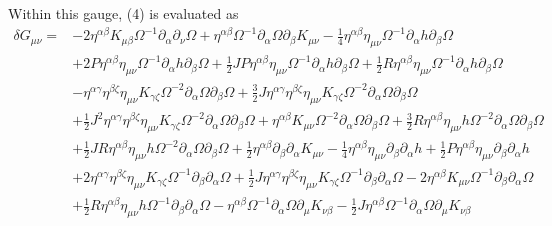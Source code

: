 \documentclass[10pt,letterpaper]{article}
\begin{document}
Within this gauge, (4) is evaluated as
\begin{align}
\delta G_{\mu\nu}={}&-2 \eta^{\alpha \beta} K_{\mu \beta} \Omega^{-1} \partial_{\alpha}\partial_{\nu}\Omega
 + \eta^{\alpha \beta} \Omega^{-1} \partial_{\alpha}\Omega \partial_{\beta}K_{\mu \nu}
 -  \tfrac{1}{4} \eta^{\alpha \beta} \eta_{\mu \nu} \Omega^{-1} \partial_{\alpha}h \partial_{\beta}\Omega\nonumber\\
& + 2 P \eta^{\alpha \beta} \eta_{\mu \nu} \Omega^{-1} \partial_{\alpha}h \partial_{\beta}\Omega
 + \tfrac{1}{2} J P \eta^{\alpha \beta} \eta_{\mu \nu} \Omega^{-1} \partial_{\alpha}h \partial_{\beta}\Omega
 + \tfrac{1}{2} R \eta^{\alpha \beta} \eta_{\mu \nu} \Omega^{-1} \partial_{\alpha}h \partial_{\beta}\Omega\nonumber\\
& -  \eta^{\alpha \gamma} \eta^{\beta \zeta} \eta_{\mu \nu} K_{\gamma \zeta} \Omega^{-2} \partial_{\alpha}\Omega \partial_{\beta}\Omega
 + \tfrac{3}{2} J \eta^{\alpha \gamma} \eta^{\beta \zeta} \eta_{\mu \nu} K_{\gamma \zeta} \Omega^{-2} \partial_{\alpha}\Omega \partial_{\beta}\Omega\nonumber\\
& + \tfrac{1}{2} J^2 \eta^{\alpha \gamma} \eta^{\beta \zeta} \eta_{\mu \nu} K_{\gamma \zeta} \Omega^{-2} \partial_{\alpha}\Omega \partial_{\beta}\Omega
 + \eta^{\alpha \beta} K_{\mu \nu} \Omega^{-2} \partial_{\alpha}\Omega \partial_{\beta}\Omega
 + \tfrac{3}{2} R \eta^{\alpha \beta} \eta_{\mu \nu} h \Omega^{-2} \partial_{\alpha}\Omega \partial_{\beta}\Omega\nonumber\\
& + \tfrac{1}{2} J R \eta^{\alpha \beta} \eta_{\mu \nu} h \Omega^{-2} \partial_{\alpha}\Omega \partial_{\beta}\Omega
 + \tfrac{1}{2} \eta^{\alpha \beta} \partial_{\beta}\partial_{\alpha}K_{\mu \nu}
 -  \tfrac{1}{4} \eta^{\alpha \beta} \eta_{\mu \nu} \partial_{\beta}\partial_{\alpha}h
 + \tfrac{1}{2} P \eta^{\alpha \beta} \eta_{\mu \nu} \partial_{\beta}\partial_{\alpha}h\nonumber\\
& + 2 \eta^{\alpha \gamma} \eta^{\beta \zeta} \eta_{\mu \nu} K_{\gamma \zeta} \Omega^{-1} \partial_{\beta}\partial_{\alpha}\Omega
 + \tfrac{1}{2} J \eta^{\alpha \gamma} \eta^{\beta \zeta} \eta_{\mu \nu} K_{\gamma \zeta} \Omega^{-1} \partial_{\beta}\partial_{\alpha}\Omega
 - 2 \eta^{\alpha \beta} K_{\mu \nu} \Omega^{-1} \partial_{\beta}\partial_{\alpha}\Omega\nonumber\\
& + \tfrac{1}{2} R \eta^{\alpha \beta} \eta_{\mu \nu} h \Omega^{-1} \partial_{\beta}\partial_{\alpha}\Omega
 -  \eta^{\alpha \beta} \Omega^{-1} \partial_{\alpha}\Omega \partial_{\mu}K_{\nu \beta}
 -  \tfrac{1}{2} J \eta^{\alpha \beta} \Omega^{-1} \partial_{\alpha}\Omega \partial_{\mu}K_{\nu \beta}\nonumber\\

\end{align}
\end{document}
